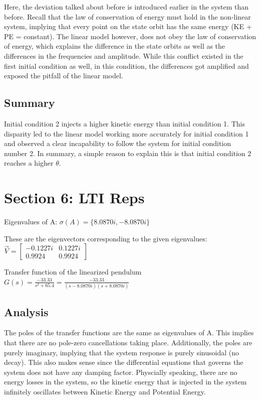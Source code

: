 \documentclass[10pt]{article}
\begin{document}
Here, the deviation talked about before is introduced earlier in the system than before. Recall that the law of conservation of energy must hold in the non-linear system, implying that every point on the state orbit has the same energy (KE + PE = constant). The linear model however, does not obey the law of conservation of energy, which explains the difference in the state orbits as well as the differences in the frequencies and amplitude. While this conflict existed in the first initial condition as well, in this condition, the differences got amplified and exposed the pitfall of the linear model.  

\subsection{Summary}
Initial condition 2 injects a higher kinetic energy than initial condition 1. This disparity led to the linear model working more accurately for initial condition 1 and observed a clear incapability to follow the system for initial condition number 2. In summary, a simple reason to explain this is that initial condition 2 reaches a higher $\theta$.

\section{Section 6: LTI Reps}
Eigenvalues of A:
\begin{math}
\sigma(A) = \{8.0870i, -8.0870i\}
\end{math}

These are the eigenvectors corresponding to the given eigenvalues:
\begin{math}
    \vec{V} = \begin{bmatrix}
    -0.1227i & 0.1227i\\ 0.9924 & 0.9924 
    \end{bmatrix}
\end{math}

Transfer function of the linearized pendulum
\begin{math}
G(s) = \frac{-33.33}{s^2+65.4} = \frac{-33.33}{(s-8.0870i)(s+8.0870i)} 
\end{math}

\subsection{Analysis}
The poles of the transfer functions are the same as eigenvalues of A. This implies that there are no pole-zero cancellations taking place. Additionally, the poles are purely imaginary, implying that the system response is purely sinusoidal (no decay). This also makes sense since the differential equations that governs the system does not have any damping factor. Physcially speaking, there are no energy losses in the system, so the kinetic energy that is injected in the system infinitely oscillates between Kinetic Energy and Potential Energy. 
\end{document}
